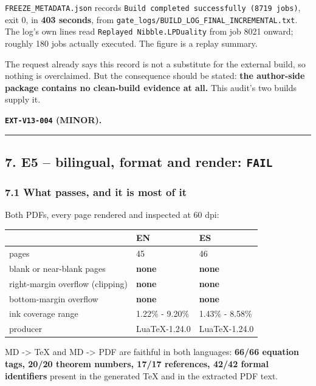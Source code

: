 \documentclass[
  10pt,
]{article}
\newcounter{none} %
\begin{document}
\texttt{FREEZE\_METADATA.json} records
\texttt{Build\ completed\ successfully\ (8719\ jobs)}, exit 0, in
\textbf{403 seconds}, from
\texttt{gate\_logs/BUILD\_LOG\_FINAL\_INCREMENTAL.txt}. The log's own
lines read \texttt{Replayed\ Nibble.LPDuality} from job 8021 onward;
roughly 180 jobs actually executed. The figure is a replay summary.

The request already says this record is not a substitute for the
external build, so nothing is overclaimed. But the consequence should be
stated: \textbf{the author-side package contains no clean-build evidence
at all.} This audit's two builds supply it.

\textbf{\texttt{EXT-V13-004} (MINOR).}

\begin{center}\rule{0.5\linewidth}{0.5pt}\end{center}

\subsection{\texorpdfstring{7. E5 -- bilingual, format and render:
\texttt{FAIL}}{7. E5 -- bilingual, format and render: FAIL}}\label{e5-bilingual-format-and-render-fail}

\subsubsection{7.1 What passes, and it is most of
it}\label{what-passes-and-it-is-most-of-it}

Both PDFs, every page rendered and inspected at 60 dpi:

{\def\LTcaptype{none} %
\begin{longtable}[]{@{}lll@{}}
\toprule\noalign{}
& EN & ES \\
\midrule\noalign{}
\endhead
\bottomrule\noalign{}
\endlastfoot
pages & 45 & 46 \\
blank or near-blank pages & \textbf{none} & \textbf{none} \\
right-margin overflow (clipping) & \textbf{none} & \textbf{none} \\
bottom-margin overflow & \textbf{none} & \textbf{none} \\
ink coverage range & 1.22\% - 9.20\% & 1.43\% - 8.58\% \\
producer & LuaTeX-1.24.0 & LuaTeX-1.24.0 \\
\end{longtable}
}

MD -\textgreater{} TeX and MD -\textgreater{} PDF are faithful in both
languages: \textbf{66/66 equation tags, 20/20 theorem numbers, 17/17
references, 42/42 formal identifiers} present in the generated TeX and
in the extracted PDF text.
\end{document}
